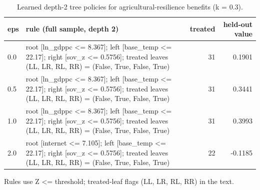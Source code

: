 \begin{table}[htbp]
\centering
\caption{Learned depth-2 tree policies for agricultural-resilience benefits (k = 0.3).}
\label{tab:agri_trees}
\begin{tabular}{lp{8cm}rr}
\toprule
eps & rule (full sample, depth 2) & treated & held-out value \\
\midrule
0.0 & root [ln\_gdppc <= 8.367]; left [base\_temp <= 22.17]; right [sov\_z <= 0.5756]; treated leaves (LL, LR, RL, RR) = (False, True, False, True) & 31 & 0.1901 \\
0.5 & root [ln\_gdppc <= 8.367]; left [base\_temp <= 22.17]; right [sov\_z <= 0.5756]; treated leaves (LL, LR, RL, RR) = (False, True, False, True) & 31 & 0.3441 \\
1.0 & root [ln\_gdppc <= 8.367]; left [base\_temp <= 22.17]; right [sov\_z <= 0.5756]; treated leaves (LL, LR, RL, RR) = (False, True, False, True) & 31 & 0.3993 \\
2.0 & root [internet <= 7.105]; left [base\_temp <= 22.17]; right [sov\_z <= 0.5756]; treated leaves (LL, LR, RL, RR) = (False, True, False, True) & 22 & -0.1185 \\
\bottomrule
\end{tabular}
\par\smallskip\footnotesize Rules use Z <= threshold; treated-leaf flags (LL, LR, RL, RR) in the text.
\end{table}

